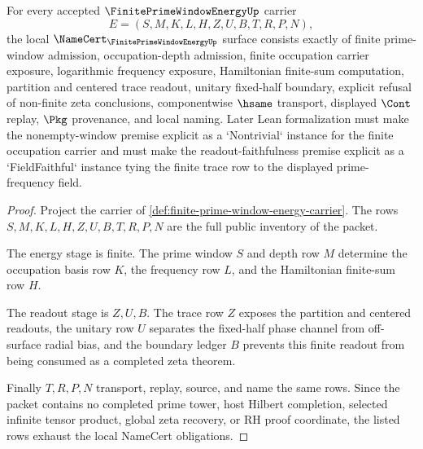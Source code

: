 \begin{theorem}
\label{thm:finite-prime-window-energy-namecert-obligations}
For every accepted $\FinitePrimeWindowEnergyUp$ carrier
$$
E=(S,M,K,L,H,Z,U,B,T,R,P,N),
$$
the local $\NameCert_{\FinitePrimeWindowEnergyUp}$ surface consists exactly of finite prime-window admission, occupation-depth admission, finite occupation carrier exposure, logarithmic frequency exposure, Hamiltonian finite-sum computation, partition and centered trace readout, unitary fixed-half boundary, explicit refusal of non-finite zeta conclusions, componentwise $\hsame$ transport, displayed $\Cont$ replay, $\Pkg$ provenance, and local naming. Later Lean formalization must make the nonempty-window premise explicit as a `Nontrivial` instance for the finite occupation carrier and must make the readout-faithfulness premise explicit as a `FieldFaithful` instance tying the finite trace row to the displayed prime-frequency field.
\end{theorem}
\begin{proof}
Project the carrier of \autoref{def:finite-prime-window-energy-carrier}. The rows $S,M,K,L,H,Z,U,B,T,R,P,N$ are the full public inventory of the packet.

The energy stage is finite. The prime window $S$ and depth row $M$ determine the occupation basis row $K$, the frequency row $L$, and the Hamiltonian finite-sum row $H$.

The readout stage is $Z,U,B$. The trace row $Z$ exposes the partition and centered readouts, the unitary row $U$ separates the fixed-half phase channel from off-surface radial bias, and the boundary ledger $B$ prevents this finite readout from being consumed as a completed zeta theorem.

Finally $T,R,P,N$ transport, replay, source, and name the same rows. Since the packet contains no completed prime tower, host Hilbert completion, selected infinite tensor product, global zeta recovery, or RH proof coordinate, the listed rows exhaust the local NameCert obligations.
\end{proof}


